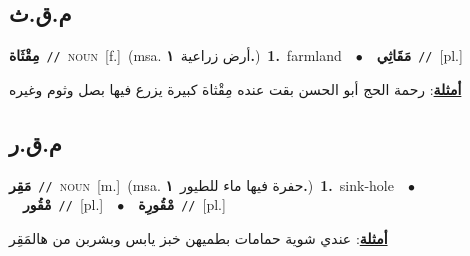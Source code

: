 \documentclass[10pt,a4paper,twoside]{article} %
\begin{document}
\begin{multicols}{2}
\vspace{-3mm}
\subsection*{\color{blue}\foreignlanguage{arabic}{م.ق.ث}\color{blue}{}} 

{\setlength\topsep{0pt}\textbf{\foreignlanguage{arabic}{مِقْثَاة}}\ {\color{gray}\texttt{//}\color{black}}\ \textsc{noun}\ [f.]\ \color{gray}(msa. \foreignlanguage{arabic}{أرض زراعية}~\foreignlanguage{arabic}{\textbf{١.}})\color{black}\ \textbf{1.}~farmland\ \ $\bullet$\ \ \setlength\topsep{0pt}\textbf{\foreignlanguage{arabic}{مَقَاثِي}}\ {\color{gray}\texttt{//}\color{black}}\ [pl.]\  \begin{flushright}\color{gray}\foreignlanguage{arabic}{\textbf{\underline{\foreignlanguage{arabic}{أمثلة}}}: رحمة الحج أبو الحسن بقت عنده مِقْثاة كبيرة يزرع فيها بصل وثوم وغيره}\end{flushright}\color{black}} \vspace{2mm}

\vspace{-3mm}
\subsection*{\color{blue}\foreignlanguage{arabic}{م.ق.ر}\color{blue}{}} 

{\setlength\topsep{0pt}\textbf{\foreignlanguage{arabic}{مَقِر}}\ {\color{gray}\texttt{//}\color{black}}\ \textsc{noun}\ [m.]\ \color{gray}(msa. \foreignlanguage{arabic}{حفرة فيها ماء للطيور}~\foreignlanguage{arabic}{\textbf{١.}})\color{black}\ \textbf{1.}~sink-hole\ \ $\bullet$\ \ \setlength\topsep{0pt}\textbf{\foreignlanguage{arabic}{مْقُور}}\ {\color{gray}\texttt{//}\color{black}}\ [pl.]\ \ $\bullet$\ \ \setlength\topsep{0pt}\textbf{\foreignlanguage{arabic}{مْقُورِة}}\ {\color{gray}\texttt{//}\color{black}}\ [pl.]\  \begin{flushright}\color{gray}\foreignlanguage{arabic}{\textbf{\underline{\foreignlanguage{arabic}{أمثلة}}}: عندي شوية حمامات بطميهن خبز يابس وبشربن من هالمَقِر}\end{flushright}\color{black}} \vspace{2mm}


\end{multicols}
\end{document}
